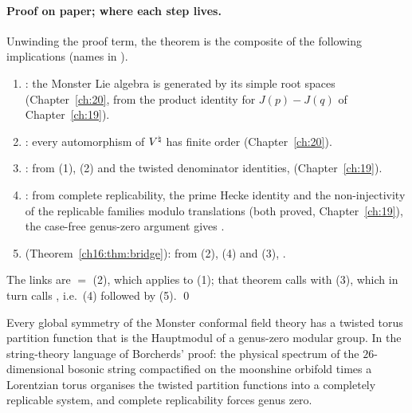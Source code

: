 \paragraph{Proof on paper; where each step lives.}  Unwinding the proof term, the theorem is the composite of the
following implications (names in ).
\begin{enumerate}[label=(\arabic*)]
\item {}: the Monster Lie algebra is generated by its simple root spaces
  (Chapter~\ref{ch:20}, from the product identity for $J(p)-J(q)$ of Chapter~\ref{ch:19}).
\item {}: every automorphism of ${V^{\natural}}$ has finite order (Chapter~\ref{ch:20}).
\item {}: from (1), (2) and the twisted denominator identities,
   (Chapter~\ref{ch:19}).
\item {}: from complete replicability, the prime Hecke identity and the
  non-injectivity of the replicable families modulo translations (both proved, Chapter~\ref{ch:19}), the case-free
  genus-zero argument gives .
\item {} (Theorem~\ref{ch16:thm:bridge}): from (2), (4) and (3), .
\end{enumerate}
The links are  $=$  (2), which applies
 to (1); that theorem calls
 with (3), which in turn calls
, i.e.\ (4) followed by (5). \qed
\begin{physics}
Every global symmetry of the Monster conformal field theory has a twisted torus partition function that is the
Hauptmodul of a genus-zero modular group.  In the string-theory language of Borcherds' proof: the physical spectrum of
the $26$-dimensional bosonic string compactified on the moonshine orbifold times a Lorentzian torus organises the
twisted partition functions into a completely replicable system, and complete replicability forces genus zero.
\end{physics}
